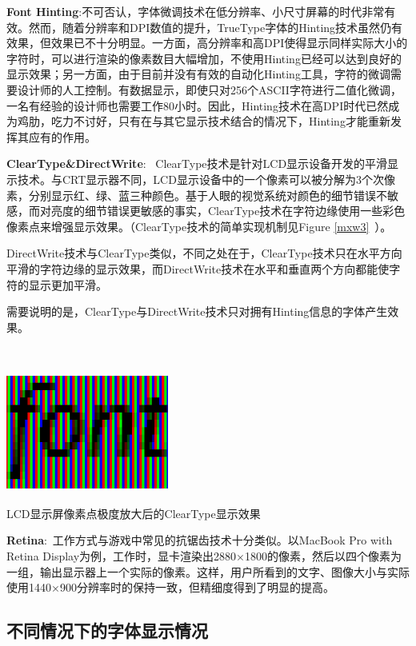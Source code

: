 \documentclass[a4paper]{article}
\begin{document}
\textbf{\large Font Hinting}:不可否认，字体微调技术在低分辨率、小尺寸屏幕的时代非常有效。然而，随着分辨率和DPI数值的提升，TrueType字体的Hinting技术虽然仍有效果，但效果已不十分明显。一方面，高分辨率和高DPI使得显示同样实际大小的字符时，可以进行渲染的像素数目大幅增加，不使用Hinting已经可以达到良好的显示效果；另一方面，由于目前并没有有效的自动化Hinting工具，字符的微调需要设计师的人工控制。有数据显示，即使只对256个ASCII字符进行二值化微调，一名有经验的设计师也需要工作80小时\cite{mxw3}。因此，Hinting技术在高DPI时代已然成为鸡肋，吃力不讨好，只有在与其它显示技术结合的情况下，Hinting才能重新发挥其应有的作用。

\textbf{\large ClearType\&DirectWrite}: ~ClearType技术是针对LCD显示设备开发的平滑显示技术。与CRT显示器不同，LCD显示设备中的一个像素可以被分解为3个次像素，分别显示红、绿、蓝三种颜色。基于人眼的视觉系统对颜色的细节错误不敏感，而对亮度的细节错误更敏感的事实，ClearType技术在字符边缘使用一些彩色像素点来增强显示效果\cite{mxw4}。（ClearType技术的简单实现机制见Figure \ref{mxw3}~）。

DirectWrite技术与ClearType类似，不同之处在于，ClearType技术只在水平方向平滑的字符边缘的显示效果，而DirectWrite技术在水平和垂直两个方向都能使字符的显示更加平滑。

需要说明的是，ClearType与DirectWrite技术只对拥有Hinting信息的字体产生效果。

~~

\makeatletter
\def\@captype{figure}
\makeatother
\centerline{\includegraphics [width=0.4\textwidth]{mxw3.png} }
\caption{LCD显示屏像素点极度放大后的ClearType显示效果}
\label{mxw3}

\textbf{\large Retina}:~工作方式与游戏中常见的抗锯齿技术十分类似。以MacBook Pro with Retina Display为例，工作时，显卡渲染出2880×1800的像素，然后以四个像素为一组，输出显示器上一个实际的像素。这样，用户所看到的文字、图像大小与实际使用1440×900分辨率时的保持一致，但精细度得到了明显的提高。


\subsection{不同情况下的字体显示情况}
\end{document}
